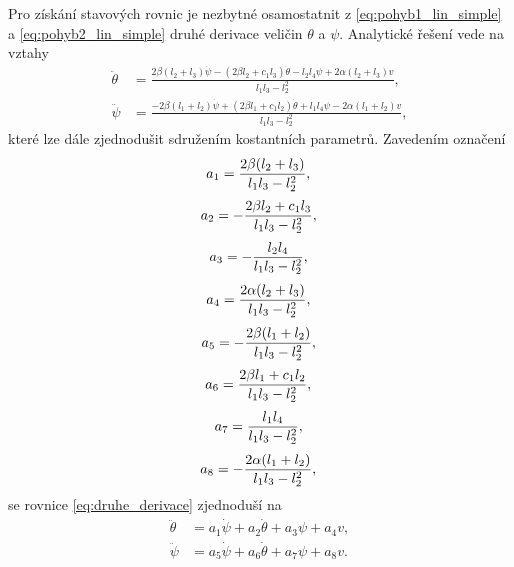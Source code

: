 \documentclass[conference]{IEEEtran}
\begin{document}
Pro získání stavových rovnic je nezbytné osamostatnit z \eqref{eq:pohyb1_lin_simple} a \eqref{eq:pohyb2_lin_simple}
druhé derivace veličin $\theta$ a $\psi$. Analytické řešení vede na vztahy
\begin{equation}
    \begin{split}
        \ddot{\theta} & = \frac{2\beta (l_2 + l_3) \dot{\psi}  - (2 \beta l_2 + c_1 l_3) \dot{\theta} - l_2 l_4 \psi + 2 \alpha (l_2 + l_3) v}{l_1 l_3 - l_2^2}, \\
        \ddot{\psi} &= \frac{- 2 \beta (l_1 + l_2) \dot{\psi} + (2 \beta l_1 + c_1 l_2)\dot{\theta}  + l_1 l_4 \psi - 2 \alpha (l_1 + l_2) v}{l_1 l_3 - l_2^2},
        \label{eq:druhe_derivace}
    \end{split}
\end{equation}
které lze dále zjednodušit sdružením kostantních parametrů. Zavedením označení
\begin{equation*}
    a_1 = \frac{2\beta (l_2 + l_3)}{l_1 l_3 - l_2^2}, \\
\end{equation*}
\begin{equation*}
    a_2 = -\frac{2 \beta l_2 + c_1 l_3}{l_1 l_3 - l_2^2}, \\
\end{equation*}
\begin{equation*}
    a_3 = -\frac{l_2 l_4}{l_1 l_3 - l_2^2}, \\
\end{equation*}
\begin{equation*}
    a_4 = \frac{2 \alpha (l_2 + l_3)}{l_1 l_3 - l_2^2}, \\
\end{equation*}
\begin{equation*}
    a_5 = -\frac{2 \beta (l_1 + l_2)}{l_1 l_3 - l_2^2}, \\
\end{equation*}
\begin{equation*}
    a_6 = \frac{2 \beta l_1 + c_1 l_2}{l_1 l_3 - l_2^2}, \\
\end{equation*}
\begin{equation*}
    a_7 = \frac{ l_1 l_4 }{l_1 l_3 - l_2^2}, \\
\end{equation*}
\begin{equation*}
    a_8 = -\frac{2 \alpha (l_1 + l_2)}{l_1 l_3 - l_2^2}, \\
\end{equation*}
se rovnice \eqref{eq:druhe_derivace} zjednoduší na
\begin{equation}
    \begin{split}
        \ddot{\theta} & = a_1 \dot{\psi} + a_2  \dot{\theta} + a_3  \psi + a_4  v, \\
        \ddot{\psi} &= a_5  \dot{\psi} + a_6  \dot {\theta} + a_7  \psi + a_8  v.
        \label{eq:druhe_derivace_easy}
    \end{split}
\end{equation}
\end{document}
